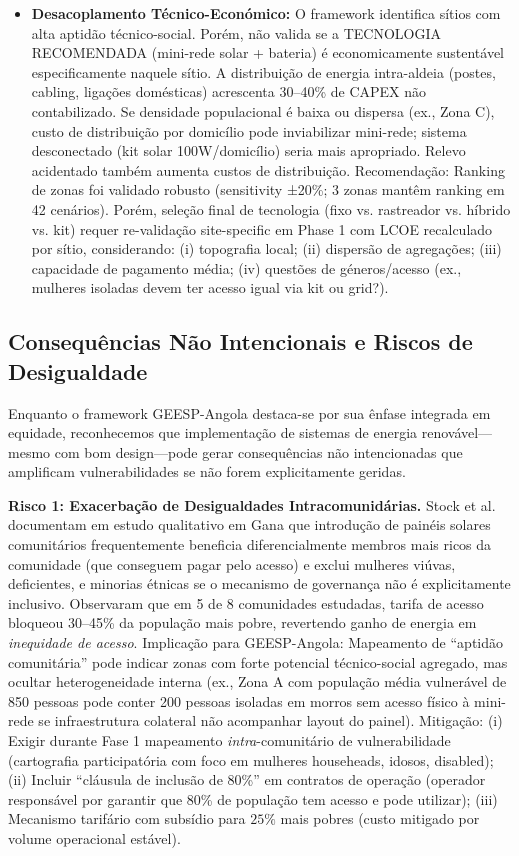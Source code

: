 \documentclass[12pt, a4paper]{article}
\begin{document}
\begin{itemize}
\item \textbf{Desacoplamento Técnico-Económico:} O framework identifica sítios com alta aptidão técnico-social. Porém, não valida se a TECNOLOGIA RECOMENDADA (mini-rede solar + bateria) é economicamente sustentável especificamente naquele sítio. A distribuição de energia intra-aldeia (postes, cabling, ligações domésticas) acrescenta 30--40\% de CAPEX não contabilizado. Se densidade populacional é baixa ou dispersa (ex., Zona C), custo de distribuição por domicílio pode inviabilizar mini-rede; sistema desconectado (kit solar 100W/domicílio) seria mais apropriado. Relevo acidentado também aumenta custos de distribuição. Recomendação: Ranking de zonas foi validado robusto (sensitivity ±20\%; 3 zonas mantêm ranking em 42 cenários). Porém, seleção final de tecnologia (fixo vs. rastreador vs. híbrido vs. kit) requer re-validação site-specific em Phase 1 com LCOE recalculado por sítio, considerando: (i) topografia local; (ii) dispersão de agregações; (iii) capacidade de pagamento média; (iv) questões de géneros/acesso (ex., mulheres isoladas devem ter acesso igual via kit ou grid?).

\end{itemize}

\subsection{Consequências Não Intencionais e Riscos de Desigualdade}

Enquanto o framework GEESP-Angola destaca-se por sua ênfase integrada em equidade, reconhecemos que implementação de sistemas de energia renovável—mesmo com bom design—pode gerar consequências não intencionadas que amplificam vulnerabilidades se não forem explicitamente geridas.

\textbf{Risco 1: Exacerbação de Desigualdades Intracomunidárias.} Stock et al.~\citep{Stock2023} documentam em estudo qualitativo em Gana que introdução de painéis solares comunitários frequentemente beneficia diferencialmente membros mais ricos da comunidade (que conseguem pagar pelo acesso) e exclui mulheres viúvas, deficientes, e minorias étnicas se o mecanismo de governança não é explicitamente inclusivo. Observaram que em 5 de 8 comunidades estudadas, tarifa de acesso bloqueou 30--45\% da população mais pobre, revertendo ganho de energia em \textit{inequidade de acesso}. Implicação para GEESP-Angola: Mapeamento de ``aptidão comunitária'' pode indicar zonas com forte potencial técnico-social agregado, mas ocultar heterogeneidade interna (ex., Zona A com população média vulnerável de 850 pessoas pode conter 200 pessoas isoladas em morros sem acesso físico à mini-rede se infraestrutura colateral não acompanhar layout do painel). Mitigação: (i) Exigir durante Fase 1 mapeamento \textit{intra}-comunitário de vulnerabilidade (cartografia participatória com foco em mulheres househeads, idosos, disabled); (ii) Incluir ``cláusula de inclusão de 80\%'' em contratos de operação (operador responsável por garantir que 80\% de população tem acesso e pode utilizar);  (iii) Mecanismo tarifário com subsídio para $25\%$ mais pobres (custo mitigado por volume operacional estável).
\end{document}

